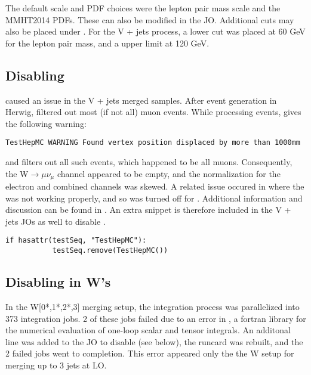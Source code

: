 The default scale and PDF choices were the lepton pair mass scale and the MMHT2014 PDFs. These can also be modified in the JO. Additional cuts may also be placed under . For the V + jets process, a lower cut was placed at 60 GeV for the lepton pair mass, and a upper limit at 120 GeV.

\subsection{Disabling }

 caused an issue in the V + jets merged samples. After event generation in Herwig,  filtered out most (if not all) muon events. While processing events,  gives the following warning:

\begin{verbatim}
TestHepMC WARNING Found vertex position displaced by more than 1000mm
\end{verbatim}

\noindent and filters out all such events, which happened to be all muons. Consequently, the W$\rightarrow\mu\nu_{\mu}$ channel appeared to be empty, and the normalization for the electron and combined channels was skewed. A related issue occured in  where the  was not working properly, and so  was turned off for . Additional information and discussion can be found in \href{https://its.cern.ch/jira/browse/AGENE-1412?focusedCommentId=1672872&page=com.atlassian.jira.plugin.system.issuetabpanels%3Acomment-tabpanel#comment-1672872}{\textcolor{blue}{\code{AGENE-1412}}}. An extra snippet is therefore included in the V + jets JOs as well to disable \code{TestHepMC}. 

\begin{verbatim}
if hasattr(testSeq, "TestHepMC"):
           testSeq.remove(TestHepMC())
\end{verbatim}

\subsection{Disabling  in W's}

In the W[0*,1*,2*,3] merging setup, the integration process was parallelized into 373 integration jobs. 2 of these jobs failed due to an error in , a fortran library for the numerical evaluation of one-loop scalar and tensor integrals. An additonal line was added to the JO to disable  (see below), the runcard was rebuilt, and the 2 failed jobs went to completion. This error appeared only the the W setup for merging up to 3 jets at LO.

